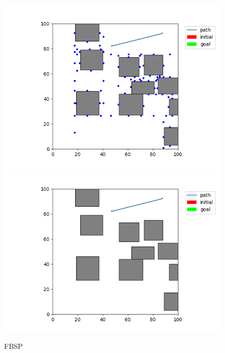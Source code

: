 \documentclass[12pt,a4paper]{article}
\begin{document}
\begin{figure}[H]
\centering
	\includegraphics[scale=.40]{10_20_fbsp_state}
    \includegraphics[scale=.40]{10_20_fbsp_path}
\caption{FBSP}
\end{figure}

\newpage
\end{document}
